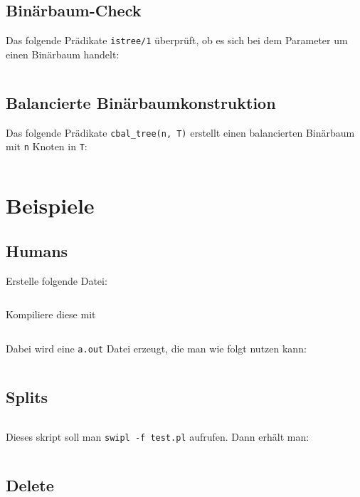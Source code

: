 \subsection{Binärbaum-Check}
Das folgende Prädikate \texttt{istree/1} überprüft, ob es sich bei dem Parameter
um einen Binärbaum handelt:

\inputminted[numbersep=5pt, tabsize=4]{prolog}{scripts/prolog/istree.pl}

\subsection{Balancierte Binärbaumkonstruktion}
Das folgende Prädikate \texttt{cbal\_tree(n, T)} erstellt einen balancierten 
Binärbaum mit \texttt{n} Knoten in \texttt{T}:

\inputminted[numbersep=5pt, tabsize=4]{prolog}{scripts/prolog/balancedtreeconstruction.pl}

\section{Beispiele}
\subsection{Humans}
Erstelle folgende Datei:
\inputminted[linenos, numbersep=5pt, tabsize=4, frame=lines, label=human.pro]{prolog}{scripts/prolog/human.pro}

Kompiliere diese mit
\inputminted[numbersep=5pt, tabsize=4]{bash}{scripts/prolog/human.sh}

Dabei wird eine \texttt{a.out} Datei erzeugt, die man wie folgt
nutzen kann:
\inputminted[numbersep=5pt, tabsize=4]{bash}{scripts/prolog/human-2.sh}

\subsection{Splits}
\inputminted[linenos, numbersep=5pt, tabsize=4, frame=lines, label=splits.pl]{prolog}{scripts/prolog/splits.pl}

Dieses skript soll man \texttt{swipl -f test.pl} aufrufen. Dann erhält man:

\inputminted[numbersep=5pt, tabsize=4]{prolog}{scripts/prolog/splits.sh}

\subsection{Delete}%
\inputminted[numbersep=5pt, tabsize=4]{prolog}{scripts/prolog/delete.pl}

